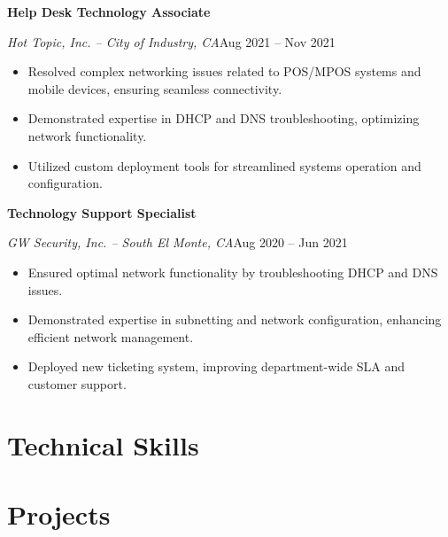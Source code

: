 \documentclass[a4paper]{article}
\begin{document}
\vspace{0.5em}
\textbf{Help Desk Technology Associate}\par
\textit{Hot Topic, Inc. -- City of Industry, CA}\hfill Aug 2021 -- Nov 2021

\begin{itemize}[noitemsep,nolistsep]
    \item Resolved complex networking issues related to POS/MPOS systems and mobile devices, ensuring seamless connectivity.
    \item Demonstrated expertise in DHCP and DNS troubleshooting, optimizing network functionality.
    \item Utilized custom deployment tools for streamlined systems operation and configuration.
\end{itemize}

\vspace{0.5em}
\textbf{Technology Support Specialist}\par
\textit{GW Security, Inc. -- South El Monte, CA}\hfill Aug 2020 -- Jun 2021

\begin{itemize}[noitemsep,nolistsep]
    \item Ensured optimal network functionality by troubleshooting DHCP and DNS issues.
    \item Demonstrated expertise in subnetting and network configuration, enhancing efficient network management.
    \item Deployed new ticketing system, improving department-wide SLA and customer support.
\end{itemize}

\section{Technical Skills}
\begin{minipage}{\textwidth}
\begin{itemize}
    \apptechnicalskills{}
\end{itemize}
\end{minipage}

\newpage{}
\vspace*{-1em}
\section{Projects}
\end{document}
